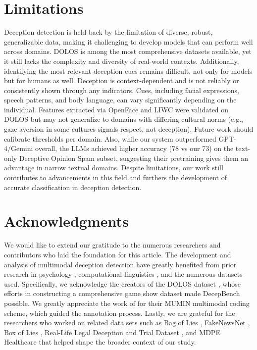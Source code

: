 \documentclass[11pt]{article}
\begin{document}
\section{Limitations}
Deception detection is held back by the limitation of diverse, robust, generalizable data, making it challenging to develop models that can perform well across domains. DOLOS is among the most comprehensive datasets available, yet it still lacks the complexity and diversity of real-world contexts. Additionally, identifying the most relevant deception cues remains difficult, not only for models but for humans as well. Deception is context-dependent and is not reliably or consistently shown through any indicators. Cues, including facial expressions, speech patterns, and body language, can vary significantly depending on the individual. Features extracted via OpenFace and LIWC were validated on DOLOS but may not generalize to domains with differing cultural norms (e.g., gaze aversion in some cultures signals respect, not deception). Future work should calibrate thresholds per domain. Also, while our system outperformed GPT-4/Gemini overall, the LLMs achieved higher accuracy (78 vs our 73) on the text-only Deceptive Opinion Spam subset, suggesting their pretraining gives them an advantage in narrow textual domains. Despite limitations, our work still contributes to advancements in this field and furthers the development of accurate classification in deception detection.

\section*{Acknowledgments}
We would like to extend our gratitude to the numerous researchers and contributors who laid the foundation for this article. The development and analysis of multimodal deception detection have greatly benefited from prior research in psychology \citep{Vrij2008, 10.1177/0963721410391245, Masip2005, Buller1996, Hauch2015, 10.1177/0261927X02021004001}, computational linguistics \citep{feng-etal-2012-characterizing}, and the numerous datasets used. Specifically, we acknowledge the creators of the DOLOS dataset \citep{guo2023audiovisualdeceptiondetectiondolos}, whose efforts in constructing a comprehensive game show dataset made DecepBench possible. We greatly appreciate the work of \citep{article} for their MUMIN multimodal coding scheme, which guided the annotation process. Lastly, we are grateful for the researchers who worked on related data sets such as Bag of Lies \citep{9025340}, FakeNewsNet \citep{shu2019fakenewsnet}, Box of Lies \citep{soldner2019box}, Real-Life Legal Deception and Trial Dataset \citep{perez2015deception, fornaciari2014identifying}, and MDPE Healthcare \citep{cai2024mdpemultimodaldeceptiondataset} that helped shape the broader context of our study. 
\end{document}
